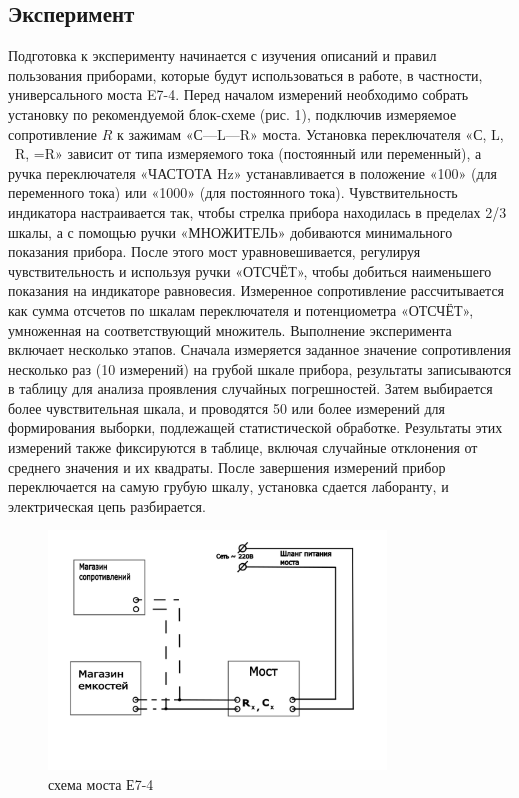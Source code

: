 \subsection{Эксперимент}
Подготовка к эксперименту начинается с изучения описаний и правил пользования приборами, которые будут использоваться в работе, в частности, универсального моста E7-4. Перед началом измерений необходимо собрать установку по рекомендуемой блок-схеме (рис. 1), подключив измеряемое сопротивление $R$ к зажимам «С—L—R» моста. Установка переключателя «С, L, ~R, =R» зависит от типа измеряемого тока (постоянный или переменный), а ручка переключателя «ЧАСТОТА Hz» устанавливается в положение «100» (для переменного тока) или «1000» (для постоянного тока). Чувствительность индикатора настраивается так, чтобы стрелка прибора находилась в пределах 2/3 шкалы, а с помощью ручки «МНОЖИТЕЛЬ» добиваются минимального показания прибора. После этого мост уравновешивается, регулируя чувствительность и используя ручки «ОТСЧЁТ», чтобы добиться наименьшего показания на индикаторе равновесия. Измеренное сопротивление рассчитывается как сумма отсчетов по шкалам переключателя и потенциометра «ОТСЧЁТ», умноженная на соответствующий множитель.
\newline
Выполнение эксперимента включает несколько этапов. Сначала измеряется заданное значение сопротивления несколько раз (10 измерений) на грубой шкале прибора, результаты записываются в таблицу для анализа проявления случайных погрешностей. Затем выбирается более чувствительная шкала, и проводятся 50 или более измерений для формирования выборки, подлежащей статистической обработке. Результаты этих измерений также фиксируются в таблице, включая случайные отклонения от среднего значения и их квадраты. После завершения измерений прибор переключается на самую грубую шкалу, установка сдается лаборанту, и электрическая цепь разбирается.



\begin{figure}[ht!]
\centering
\includegraphics[width=0.8\textwidth]{схема}
\caption{схема моста Е7-4}
\label{fig:sketch}
\end{figure}

